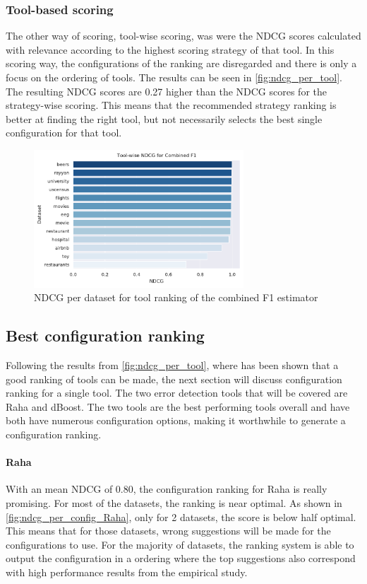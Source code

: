 \subsubsection{Tool-based scoring}
The other way of scoring, tool-wise scoring, was were the NDCG scores calculated with relevance according to the highest scoring strategy of that tool. In this scoring way, the configurations of the ranking are disregarded and there is only a focus on the ordering of tools. The results can be seen in \autoref{fig:ndcg_per_tool}. The resulting NDCG scores are 0.27 higher than the NDCG scores for the strategy-wise scoring. This means that the recommended strategy ranking is better at finding the right tool, but not necessarily selects the best single configuration for that tool. 

\begin{figure}[H]
    \centering
    \includegraphics[width=0.7\textwidth]{thesis/Figures/RQ3/15_ranking_ndcg_combined_f1_tool_wise.pdf}
    \caption{NDCG per dataset for tool ranking of the combined F1 estimator}
    \label{fig:ndcg_per_tool}
\end{figure}


\subsection{Best configuration ranking}
Following the results from \autoref{fig:ndcg_per_tool}, where has been shown that a good ranking of tools can be made, the next section will discuss configuration ranking for a single tool. The two error detection tools that will be covered are Raha and dBoost. The two tools are the best performing tools overall and have both have numerous configuration options, making it worthwhile to generate a configuration ranking.

\paragraph{Raha} With an mean NDCG of 0.80, the configuration ranking for Raha is really promising. For most of the datasets, the ranking is near optimal. As shown in \autoref{fig:ndcg_per_config_Raha}, only for 2 datasets, the score is below half optimal. This means that for those datasets, wrong suggestions will be made for the configurations to use. For the majority of datasets, the ranking system is able to output the configuration in a ordering where the top suggestions also correspond with high performance results from the empirical study. 

